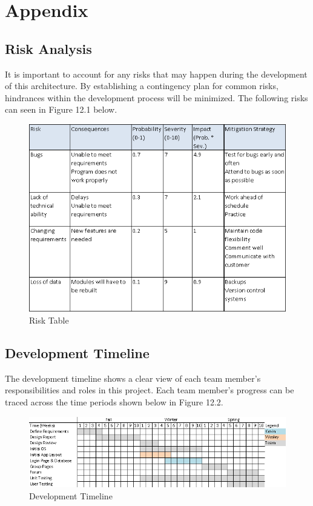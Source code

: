 \appendix

\chapter*{Appendix}

\section{Risk Analysis}
It is important to account for any risks that may happen during the development of this architecture. By establishing a contingency plan for common risks, hindrances within the development process will be minimized. The following risks can seen in Figure 12.1 below.

\begin{figure}[h]
	\includegraphics[width=\linewidth]{images/risk_analysis.png}
	\caption{Risk Table}
	\label{fig:risk table}
	\centering
\end{figure}

\clearpage
\newpage

\section{Development Timeline}
The development timeline shows a clear view of each team member’s responsibilities and roles in this project. Each team member’s progress can be traced across the time periods shown below in Figure 12.2.

\begin{figure}[h]
	\includegraphics[width=\linewidth]{images/timeline.png}
	\caption{Development Timeline}
	\label{fig:timeline}
	\centering
\end{figure}